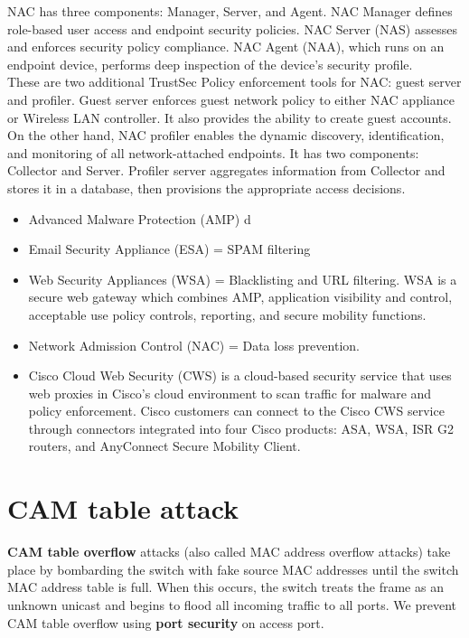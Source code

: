NAC has three components: Manager, Server, and Agent. NAC Manager defines role-based user access and endpoint security policies. NAC Server (NAS) assesses and enforces security policy compliance. NAC Agent (NAA), which runs on an endpoint device, performs deep inspection of the device's security profile.\\

These are two additional TrustSec Policy enforcement tools for NAC: guest server and profiler. Guest server enforces guest network policy to either NAC appliance or Wireless LAN controller. It also provides the ability to create guest accounts. \\

On the other hand, NAC profiler enables the dynamic discovery, identification, and monitoring of all network-attached endpoints. It has two components: Collector and Server. Profiler server aggregates information from Collector and stores it in a database, then provisions the appropriate access decisions.

\begin{itemize}
\item Advanced Malware Protection (AMP) d
\item Email Security Appliance (ESA) = SPAM filtering
\item Web Security Appliances (WSA) = Blacklisting and URL filtering. WSA is a secure web gateway which combines AMP, application visibility and control, acceptable use policy controls, reporting, and secure mobility functions. 
\item Network Admission Control (NAC) = Data loss prevention. 
\item Cisco Cloud Web Security (CWS) is a cloud-based security service that uses web proxies in Cisco’s cloud environment to scan traffic for malware and policy enforcement. Cisco customers can connect to the Cisco CWS service through connectors integrated into four Cisco products: ASA, WSA, ISR G2 routers, and AnyConnect Secure Mobility Client.
\end{itemize}


\section{CAM table attack}

\textbf{CAM table overflow} attacks (also called MAC address overflow attacks) take place by bombarding the switch with fake source MAC addresses until the switch MAC address table is full. When this occurs, the switch treats the frame as an unknown unicast and begins to flood all incoming traffic to all ports. We prevent CAM table overflow using \textbf{port security} on access port.\\

